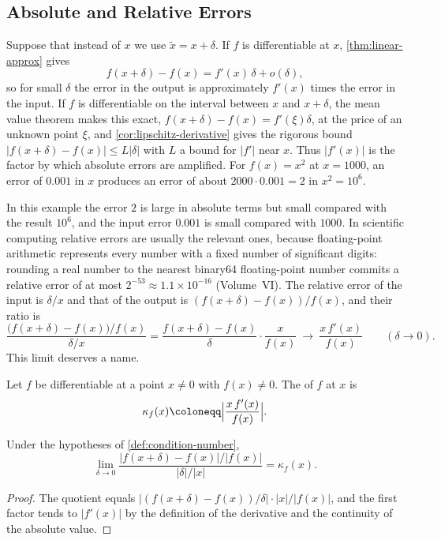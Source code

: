 \subsection{Absolute and Relative Errors}

Suppose that instead of $x$ we use $\tilde x=x+\delta$. If $f$ is differentiable at $x$, \cref{thm:linear-approx} gives
\[
f(x+\delta)-f(x)=f'(x)\,\delta+o(\delta),
\]
so for small $\delta$ the error in the output is approximately $f'(x)$ times the error in the input. If $f$ is differentiable on the interval between $x$ and $x+\delta$, the mean value theorem makes this exact, $f(x+\delta)-f(x)=f'(\xi)\delta$, at the price of an unknown point $\xi$, and \cref{cor:lipschitz-derivative} gives the rigorous bound $|f(x+\delta)-f(x)|\le L|\delta|$ with $L$ a bound for $|f'|$ near $x$. Thus $|f'(x)|$ is the factor by which absolute errors are amplified. For $f(x)=x^2$ at $x=1000$, an error of $0.001$ in $x$ produces an error of about $2000\cdot0.001=2$ in $x^2=10^6$.

In this example the error $2$ is large in absolute terms but small compared with the result $10^6$, and the input error $0.001$ is small compared with $1000$. In scientific computing relative errors are usually the relevant ones, because floating-point arithmetic represents every number with a fixed number of significant digits: rounding a real number to the nearest binary64 floating-point number commits a relative error of at most $2^{-53}\approx1.1\times10^{-16}$ (Volume~VI). The relative error of the input is $\delta/x$ and that of the output is $(f(x+\delta)-f(x))/f(x)$, and their ratio is
\[
\frac{\bigl(f(x+\delta)-f(x)\bigr)/f(x)}{\delta/x}=\frac{f(x+\delta)-f(x)}{\delta}\cdot\frac x{f(x)}\ \longrightarrow\ \frac{x\,f'(x)}{f(x)}\qquad(\delta\to0).
\]
This limit deserves a name.

\begin{definition}
\label{def:condition-number}
Let $f$ be differentiable at a point $x\ne0$ with $f(x)\ne0$. The  of $f$ at $x$ is
\[
\kappa_f(x)\coloneqq\Bigl|\frac{x\,f'(x)}{f(x)}\Bigr| .
\]
\end{definition}

\begin{proposition}
\label{prop:condition-number}
Under the hypotheses of \cref{def:condition-number},
\[
\lim_{\delta\to0}\frac{|f(x+\delta)-f(x)|/|f(x)|}{|\delta|/|x|}=\kappa_f(x).
\]
\end{proposition}

\begin{proof}
The quotient equals $\bigl|(f(x+\delta)-f(x))/\delta\bigr|\cdot|x|/|f(x)|$, and the first factor tends to $|f'(x)|$ by the definition of the derivative and the continuity of the absolute value.
\end{proof}

